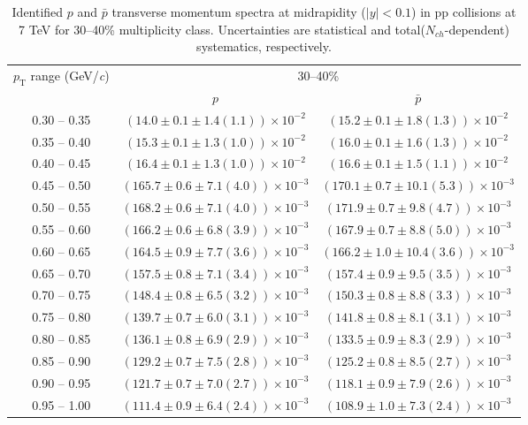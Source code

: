 \begin{table}
\caption{Identified $p$ and $\bar{p}$  transverse momentum spectra at midrapidity ($|y|<0.1$) in pp collisions at 7 TeV for 30--40\% multiplicity class. Uncertainties are statistical and total($N_{ch}$-dependent) systematics, respectively.}
\label{tab:ProtonPlus_ProtonMinus_30to40}
\begin{center}
\begin{tabular}{ c | c c }
\hline
\multirow{2}{*}{$p_{\mathrm{T}}$ range (GeV/\textit{c})} & \multicolumn{2}{c}{30--40\%} \\ & $p$& $\bar{p}$\\ 
\hline
0.30 -- 0.35 & $(14.0\pm0.1\pm1.4(1.1))\times10^{-2}$ & $(15.2\pm0.1\pm1.8(1.3))\times10^{-2}$ \\ 
0.35 -- 0.40 & $(15.3\pm0.1\pm1.3(1.0))\times10^{-2}$ & $(16.0\pm0.1\pm1.6(1.3))\times10^{-2}$ \\ 
0.40 -- 0.45 & $(16.4\pm0.1\pm1.3(1.0))\times10^{-2}$ & $(16.6\pm0.1\pm1.5(1.1))\times10^{-2}$ \\ 
0.45 -- 0.50 & $(165.7\pm0.6\pm7.1(4.0))\times10^{-3}$ & $(170.1\pm0.7\pm10.1(5.3))\times10^{-3}$ \\ 
0.50 -- 0.55 & $(168.2\pm0.6\pm7.1(4.0))\times10^{-3}$ & $(171.9\pm0.7\pm9.8(4.7))\times10^{-3}$ \\ 
0.55 -- 0.60 & $(166.2\pm0.6\pm6.8(3.9))\times10^{-3}$ & $(167.9\pm0.7\pm8.8(5.0))\times10^{-3}$ \\ 
0.60 -- 0.65 & $(164.5\pm0.9\pm7.7(3.6))\times10^{-3}$ & $(166.2\pm1.0\pm10.4(3.6))\times10^{-3}$ \\ 
0.65 -- 0.70 & $(157.5\pm0.8\pm7.1(3.4))\times10^{-3}$ & $(157.4\pm0.9\pm9.5(3.5))\times10^{-3}$ \\ 
0.70 -- 0.75 & $(148.4\pm0.8\pm6.5(3.2))\times10^{-3}$ & $(150.3\pm0.8\pm8.8(3.3))\times10^{-3}$ \\ 
0.75 -- 0.80 & $(139.7\pm0.7\pm6.0(3.1))\times10^{-3}$ & $(141.8\pm0.8\pm8.1(3.1))\times10^{-3}$ \\ 
0.80 -- 0.85 & $(136.1\pm0.8\pm6.9(2.9))\times10^{-3}$ & $(133.5\pm0.9\pm8.3(2.9))\times10^{-3}$ \\ 
0.85 -- 0.90 & $(129.2\pm0.7\pm7.5(2.8))\times10^{-3}$ & $(125.2\pm0.8\pm8.5(2.7))\times10^{-3}$ \\ 
0.90 -- 0.95 & $(121.7\pm0.7\pm7.0(2.7))\times10^{-3}$ & $(118.1\pm0.9\pm7.9(2.6))\times10^{-3}$ \\ 
0.95 -- 1.00 & $(111.4\pm0.9\pm6.4(2.4))\times10^{-3}$ & $(108.9\pm1.0\pm7.3(2.4))\times10^{-3}$ \\ 

\end{tabular}
\end{center}
\end{table}
